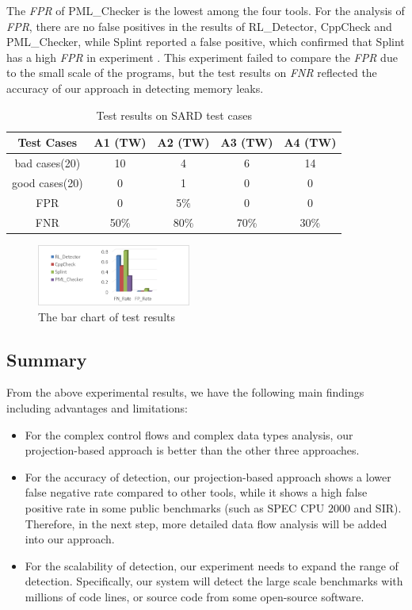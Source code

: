 The \textit{FPR} of PML\_Checker is the lowest among the four tools. For the analysis of \textit{FPR}, there are no false positives in the results of RL\_Detector, CppCheck and PML\_Checker, while Splint reported a false positive, which confirmed that Splint has a high \textit{FPR} in experiment . This experiment failed to compare the \textit{FPR} due to the small scale of the programs, but the test results on \textit{FNR} reflected the accuracy of our approach in detecting memory leaks.

\begin{table}[!h]
\center
\caption{Test results on SARD test cases}\label{tab:7}
\begin{tabular}{|c|c|c|c|c|}
\hline
\textbf{Test Cases} & \textbf{A1} (TW)& \textbf{A2} (TW) & \textbf{A3} (TW) & \textbf{A4} (TW)\\
\hline
bad cases(20) &10 & 4 & 6 & 14\\
\hline
good cases(20) & 0 & 	1 &	0 &	0\\
\hline
FPR & 0& 5\% & 0 & 0\\
\hline
FNR & 50\% & 80\% & 70\% & 30\%\\
\hline
\end{tabular}
\end{table}

\begin{figure}[!h]
\center
\includegraphics[width=0.45\textwidth]{figure/fig8-fig12/fig12}
\caption{The bar chart of test results}
\label{fig:12}
\end{figure}

\subsection{Summary}
From the above experimental results, we have the following main findings including advantages and limitations: 
\begin{itemize}
\item 
For the complex control flows and complex data types analysis, our projection-based approach is better than the other three approaches.
\item 
For the accuracy of detection, our projection-based approach shows a lower false negative rate compared to other tools, while it shows a high false positive rate in some public benchmarks (such as SPEC CPU $2000$ and SIR). Therefore, in the next step, more detailed data flow analysis will be added into our approach.
\item 
For the scalability of detection, our experiment needs to expand the range of detection. Specifically, our system will detect the large scale benchmarks with millions of code lines, or source code from some open-source software.
\end{itemize}
